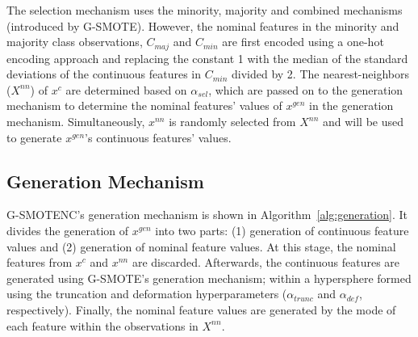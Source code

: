 \documentclass[parskip=full]{scrartcl}
\begin{document}
The selection mechanism uses the minority, majority and combined mechanisms
(introduced by G-SMOTE). However, the nominal features in the minority and
majority class observations, $C_{maj}$ and $C_{min}$ are first encoded using a
one-hot encoding approach and replacing the constant 1 with the median of the
standard deviations of the continuous features in $C_{min}$ divided by 2. The
nearest-neighbors ($X^{nn}$) of $x^c$ are determined based on $\alpha_{sel}$,
which are passed on to the generation mechanism to determine the nominal
features' values of $x^{gen}$ in the generation mechanism. Simultaneously,
$x^{nn}$ is randomly selected from $X^{nn}$ and will be used to generate
$x^{gen}$'s continuous features' values.

\subsection{Generation Mechanism}

G-SMOTENC's generation mechanism is shown in Algorithm~\ref{alg:generation}.
It divides the generation of $x^{gen}$ into two parts: (1) generation of
continuous feature values and (2) generation of nominal feature values. At
this stage, the nominal features from $x^c$ and $x^{nn}$ are discarded.
Afterwards, the continuous features are generated using G-SMOTE's generation
mechanism; within a hypersphere formed using the truncation and deformation
hyperparameters ($\alpha_{trunc}$ and $\alpha_{def}$, respectively).  Finally,
the nominal feature values are generated by the mode of each feature within
the observations in $X^{nn}$.
\end{document}

